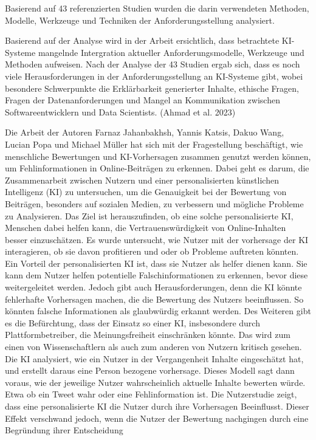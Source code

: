 \documentclass[
  12pt,
  a4paper,
]{article}
\begin{document}
Basierend auf 43 referenzierten Studien wurden die darin verwendeten
Methoden, Modelle, Werkzeuge und Techniken der Anforderungsstellung
analysiert.

Basierend auf der Analyse wird in der Arbeit ersichtlich, dass
betrachtete KI-Systeme mangelnde Intergration aktueller
Anforderungsmodelle, Werkzeuge und Methoden aufweisen. Nach der Analyse
der 43 Studien ergab sich, dass es noch viele Herausforderungen in der
Anforderungsstellung an KI-Systeme gibt, wobei besondere Schwerpunkte
die Erklärbarkeit generierter Inhalte, ethische Fragen, Fragen der
Datenanforderungen und Mangel an Kommunikation zwischen
Softwareentwicklern und Data Scientists. (Ahmad et al. 2023)

Die Arbeit der Autoren Farnaz Jahanbakhsh, Yannis Katsis, Dakuo Wang,
Lucian Popa und Michael Müller hat sich mit der Fragestellung
beschäftigt, wie menschliche Bewertungen und KI-Vorhersagen zusammen
genutzt werden können, um Fehlinformationen in Online-Beiträgen zu
erkennen. Dabei geht es darum, die Zusammenarbeit zwischen Nutzern und
einer personalisierten künstlichen Intelligenz (KI) zu untersuchen, um
die Genauigkeit bei der Bewertung von Beiträgen, besonders auf sozialen
Medien, zu verbessern und mögliche Probleme zu Analysieren. Das Ziel ist
herauszufinden, ob eine solche personalisierte KI, Menschen dabei helfen
kann, die Vertrauenswürdigkeit von Online-Inhalten besser einzuschätzen.
Es wurde untersucht, wie Nutzer mit der vorhersage der KI interagieren,
ob sie davon profitieren und oder ob Probleme auftreten könnten. Ein
Vorteil der personalisierten KI ist, dass sie Nutzer als helfer dienen
kann. Sie kann dem Nutzer helfen potentielle Falschinformationen zu
erkennen, bevor diese weitergeleitet werden. Jedoch gibt auch
Herausforderungen, denn die KI könnte fehlerhafte Vorhersagen machen,
die die Bewertung des Nutzers beeinflussen. So könnten falsche
Informationen als glaubwürdig erkannt werden. Des Weiteren gibt es die
Befürchtung, dass der Einsatz so einer KI, insbesondere durch
Plattformbetreiber, die Meinungsfreiheit einschränken könnte. Das wird
zum einen von Wissenschaftlern als auch zum anderen von Nutzern kritisch
gesehen. Die KI analysiert, wie ein Nutzer in der Vergangenheit Inhalte
eingeschätzt hat, und erstellt daraus eine Person bezogene vorhersage.
Dieses Modell sagt dann voraus, wie der jeweilige Nutzer wahrscheinlich
aktuelle Inhalte bewerten würde. Etwa ob ein Tweet wahr oder eine
Fehlinformation ist. Die Nutzerstudie zeigt, dass eine personalisierte
KI die Nutzer durch ihre Vorhersagen Beeinflusst. Dieser Effekt
verschwand jedoch, wenn die Nutzer der Bewertung nachgingen durch eine
Begründung ihrer Entscheidung
\end{document}
